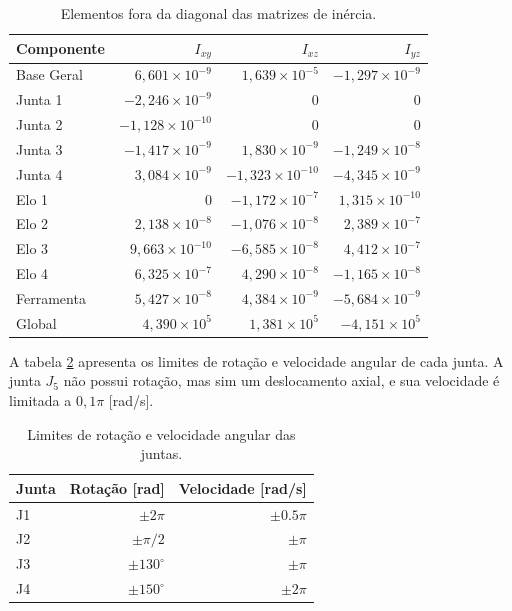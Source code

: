 \begin{table}[H]
\centering
\caption{Elementos fora da diagonal das matrizes de inércia.}
\label{tab:mi_foraDiag}
\begin{tabular}{lrrr}
\toprule
Componente 
& $I_{xy}$ 
& $I_{xz}$ 
& $I_{yz}$ \\
\midrule
Base Geral   
& $6{,}601\times 10^{-9}$ 
& $1{,}639\times 10^{-5}$ 
& $-1{,}297\times 10^{-9}$ \\
Junta 1      
& $-2{,}246\times 10^{-9}$ 
& 0 
& 0 \\
Junta 2      
& $-1{,}128\times 10^{-10}$ 
& 0 
& 0 \\
Junta 3      
& $-1{,}417\times 10^{-9}$ 
& $1{,}830\times 10^{-9}$ 
& $-1{,}249\times 10^{-8}$ \\
Junta 4      
& $3{,}084\times 10^{-9}$ 
& $-1{,}323\times 10^{-10}$ 
& $-4{,}345\times 10^{-9}$ \\
Elo 1        
& 0 
& $-1{,}172\times 10^{-7}$ 
& $1{,}315\times 10^{-10}$ \\
Elo 2        
& $2{,}138\times 10^{-8}$ 
& $-1{,}076\times 10^{-8}$ 
& $2{,}389\times 10^{-7}$ \\
Elo 3        
& $9{,}663\times 10^{-10}$ 
& $-6{,}585\times 10^{-8}$ 
& $4{,}412\times 10^{-7}$ \\
Elo 4        
& $6{,}325\times 10^{-7}$ 
& $4{,}290\times 10^{-8}$ 
& $-1{,}165\times 10^{-8}$ \\
Ferramenta   
& $5{,}427\times 10^{-8}$ 
& $4{,}384\times 10^{-9}$ 
& $-5{,}684\times 10^{-9}$ \\
Global       
& $4{,}390\times 10^{5}$ 
& $1{,}381\times 10^{5}$ 
& $-4{,}151\times 10^{5}$ \\
\bottomrule
\end{tabular}
\end{table}

A tabela \ref{tab:limites_manipulador} apresenta os limites de rotação e velocidade angular de cada junta. A junta $J_5$ não possui rotação, mas sim um deslocamento axial, e sua velocidade é limitada a $0{,}1\pi$ [rad/s].

\begin{table}[H]
\centering
\caption{Limites de rotação e velocidade angular das juntas.}
\label{tab:limites_manipulador}
\begin{tabular}{lrr}
\toprule
Junta & Rotação [rad] & Velocidade [rad/s] \\
\midrule
J1 & $\pm 2\pi$ & $\pm 0.5\pi$ \\
J2 & $\pm \pi/2$ & $\pm \pi$ \\
J3 & $\pm 130^\circ$ & $\pm \pi$ \\
J4 & $\pm 150^\circ$ & $\pm 2\pi$ \\
\bottomrule
\end{tabular}
\end{table}



